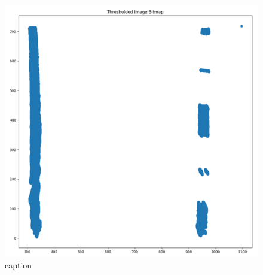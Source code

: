 \documentclass[twoside,twocolumn]{article}
\begin{document}
\begin{figure}
  \includegraphics[width=\linewidth]{daniel2.png}
  \caption{caption}
  \label{fig:d2}
\end{figure}
\end{document}

